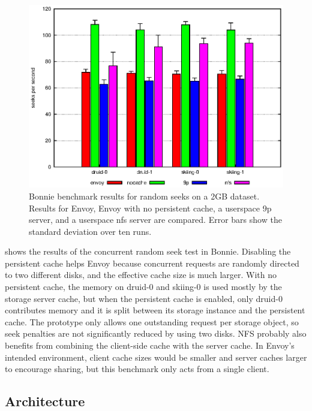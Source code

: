 \begin{figure}[t]
\centering
\includegraphics[width=\figwidth]{figures/bonnie-seek}
\caption[Bonnie benchmark results for random seeks]{Bonnie benchmark results for random seeks on a 2GB dataset. Results for Envoy, Envoy with no persistent cache, a userspace 9p server, and a userspace nfs server are compared. Error bars show the standard deviation over ten runs.}
\label{fig:bonnie-seek}
\end{figure}

 shows the results of the concurrent random seek test in Bonnie. Disabling the persistent cache helps Envoy because concurrent requests are randomly directed to two different disks, and the effective cache size is much larger. With no persistent cache, the memory on druid-0 and skiing-0 is used mostly by the storage server cache, but when the persistent cache is enabled, only druid-0 contributes memory and it is split between its storage instance and the persistent cache. The prototype only allows one outstanding request per storage object, so seek penalties are not significantly reduced by using two disks. NFS probably also benefits from combining the client-side cache with the server cache. In Envoy's intended environment, client cache sizes would be smaller and server caches larger to encourage sharing, but this benchmark only acts from a single client.

\subsection{Architecture}\label{sec:architectural-costs}

